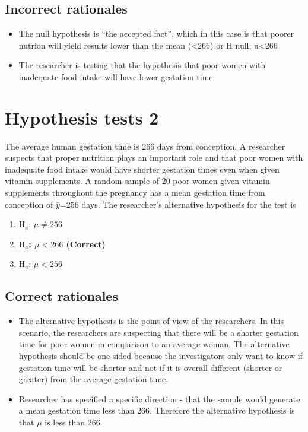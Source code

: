 \documentclass[letterpaper,9pt,twoside,printwatermark=false]{pinp}
\providecommand{\tightlist}{%
  \setlength{\itemsep}{0pt}\setlength{\parskip}{0pt}}
\begin{document}
\hypertarget{incorrect-rationales}{%
\subsection{Incorrect rationales}\label{incorrect-rationales}}

\begin{itemize}
\tightlist
\item
  The null hypothesis is ``the accepted fact'', which in this case is
  that poorer nutrion will yield results lower than the mean
  (\textless{}266) or H null: u\textless{}266
\item
  The researcher is testing that the hypothesis that poor women with
  inadequate food intake will have lower gestation time
\end{itemize}

\hypertarget{hypothesis-tests-2}{%
\section{Hypothesis tests 2}\label{hypothesis-tests-2}}

The average human gestation time is 266 days from conception. A
researcher suspects that proper nutrition plays an important role and
that poor women with inadequate food intake would have shorter gestation
times even when given vitamin supplements. A random sample of 20 poor
women given vitamin supplements throughout the pregnancy has a mean
gestation time from conception of \(\bar{y}\)=256 days. The researcher's
alternative hypothesis for the test is

\begin{enumerate}
\def\labelenumi{\alph{enumi}.}
\tightlist
\item
  \(\textrm{H}_a\): \(\mu \neq 256\)
\item
  \textbf{\(\textrm{H}_a\): \(\mu < 266\) (Correct)}
\item
  \(\textrm{H}_a\): \(\mu < 256\)
\end{enumerate}

\hypertarget{correct-rationales-1}{%
\subsection{Correct rationales}\label{correct-rationales-1}}

\begin{itemize}
\tightlist
\item
  The alternative hypothesis is the point of view of the researchers. In
  this scenario, the researchers are suspecting that there will be a
  shorter gestation time for poor women in comparison to an average
  woman. The alternative hypothesis should be one-sided because the
  investigators only want to know if gestation time will be shorter and
  not if it is overall different (shorter or greater) from the average
  gestation time.
\item
  Researcher has specified a specific direction - that the sample would
  generate a mean gestation time less than 266. Therefore the
  alternative hypothesis is that \(\mu\) is less than 266.
\end{itemize}
\end{document}
